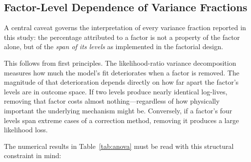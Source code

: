 \documentclass[twocolumn,12pt,a4paper]{article}
\begin{document}
\subsection{Factor-Level Dependence of Variance Fractions}

A central caveat governs the interpretation of every variance fraction
reported in this study: the percentage attributed to a factor is not a
property of the factor alone, but of the \emph{span of its levels} as
implemented in the factorial design.

This follows from first principles. The likelihood-ratio variance
decomposition measures how much the model's fit deteriorates when a
factor is removed. The magnitude of that deterioration depends directly
on how far apart the factor's levels are in outcome space. If two
levels produce nearly identical log-lives, removing that factor costs
almost nothing---regardless of how physically important the underlying
mechanism might be. Conversely, if a factor's four levels span extreme
cases of a correction method, removing it produces a large likelihood
loss.

The numerical results in Table~\ref{tab:anova} must be read with this
structural constraint in mind:
\end{document}
